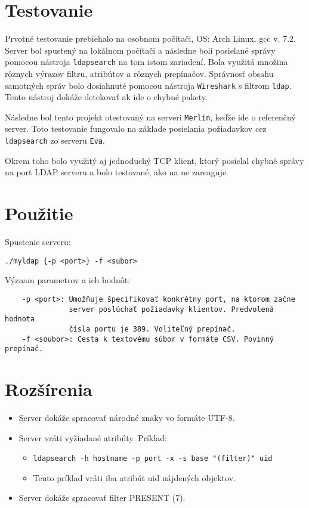 \documentclass[11pt,a4paper]{article}
\begin{document}
\section{Testovanie}
Prvotné testovanie prebiehalo na osobnom počítači, OS: Arch Linux, gcc v. 7.2. Server bol spustený na lokálnom počítači a následne boli posielané správy pomocou nástroja \texttt{ldapsearch} na tom istom zariadení. Bola využitá množina rôznych výrazov filtru, atribútov a rôznych prepínačov. Správnosť obsahu samotných správ bolo dosiahnuté pomocou nástroja \texttt{Wireshark} s filtrom \texttt{ldap}. Tento nástroj dokáže detekovať ak ide o chybné pakety.

Následne bol tento projekt otestovaný na serveri \texttt{Merlin}, keďže ide o referenčný server. Toto testovanie fungovalo na základe posielania požiadavkov cez \texttt{ldapsearch} zo serveru \texttt{Eva}.

Okrem toho bolo využitý aj jednoduchý TCP klient, ktorý posielal chybné správy na port LDAP serveru a bolo testované, ako na ne zareaguje.

\section{Použitie}
Spustenie serveru:\\

\begin{verbatim}
./myldap {-p <port>} -f <subor>
\end{verbatim}

\noindent Význam parametrov a ich hodnôt:
\begin{verbatim}
    -p <port>: Umožňuje špecifikovať konkrétny port, na ktorom začne 
               server poslúchať požiadavky klientov. Predvolená hodnota
               čísla portu je 389. Voliteľný prepínač.
    -f <soubor>: Cesta k textovému súbor v formáte CSV. Povinný prepínač.
\end{verbatim}

\section{Rozšírenia}
\begin{itemize}
	\item Server dokáže spracovať národné znaky vo formáte UTF-8.
	\item Server vráti vyžiadané atribúty. Príklad:
	\begin{itemize}
		\item \verb|ldapsearch -h hostname -p port -x -s base "(filter)" uid|
		\item Tento príklad vráti iba atribút uid nájdených objektov.
	\end{itemize}
	\item Server dokáže spracovať filter PRESENT (7).
\end{itemize}
\end{document}
